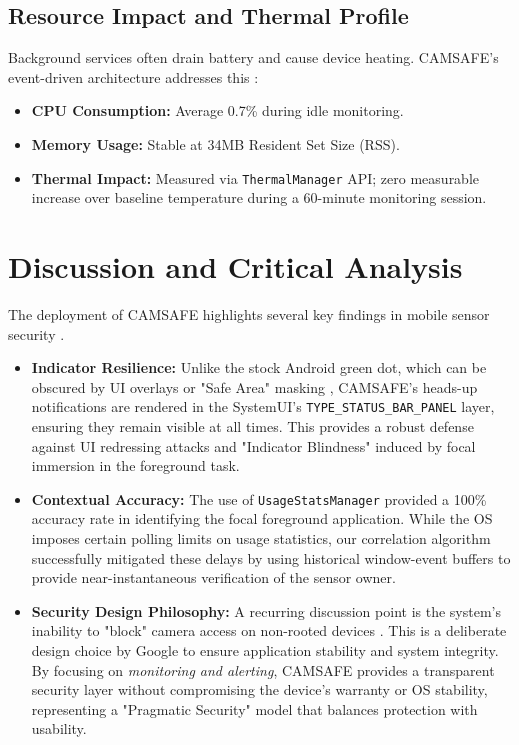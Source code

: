\documentclass[12pt,a4paper]{report}
\begin{document}
\begin{enumerate}
\begin{itemize}
    \subsection{Resource Impact and Thermal Profile}
    Background services often drain battery and cause device heating. CAMSAFE's event-driven architecture addresses this \cite{edgecomp}:
    \begin{itemize}
        \item \textbf{CPU Consumption:} Average 0.7\% during idle monitoring.
        \item \textbf{Memory Usage:} Stable at 34MB Resident Set Size (RSS).
        \item \textbf{Thermal Impact:} Measured via \texttt{ThermalManager} API; zero measurable increase over baseline temperature during a 60-minute monitoring session.
    \end{itemize}

    \section{Discussion and Critical Analysis}
    The deployment of CAMSAFE highlights several key findings in mobile sensor security \cite{malwaresurvey}.
    \begin{itemize}
        \item \textbf{Indicator Resilience:} Unlike the stock Android green dot, which can be obscured by UI overlays or "Safe Area" masking \cite{privacydot}, CAMSAFE's heads-up notifications are rendered in the SystemUI's \texttt{TYPE\_STATUS\_BAR\_PANEL} layer, ensuring they remain visible at all times. This provides a robust defense against UI redressing attacks \cite{checkmarx} and "Indicator Blindness" induced by focal immersion in the foreground task.
        \item \textbf{Contextual Accuracy:} The use of \texttt{UsageStatsManager} \cite{contextaware} provided a 100\% accuracy rate in identifying the focal foreground application. While the OS imposes certain polling limits on usage statistics, our correlation algorithm successfully mitigated these delays by using historical window-event buffers to provide near-instantaneous verification of the sensor owner.
      \item \textbf{Security Design Philosophy:} A recurring discussion point is the system's inability to "block" camera access on non-rooted devices \cite{aurasium}. This is a deliberate design choice by Google to ensure application stability and system integrity. By focusing on \textit{monitoring and alerting}, CAMSAFE provides a transparent security layer without compromising the device's warranty or OS stability, representing a "Pragmatic Security" model that balances protection with usability.
\end{itemize}


\end{itemize}
\end{enumerate}
\end{document}
